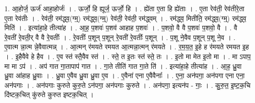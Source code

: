 \documentclass[17pt]{extarticle}
\begin{document}
1. आ॒होर्ज॒ ऊर्ज॑ आहा॒होर्जः॑ । . ऊर्जो॒ हि ह्यूर्ज॒ ऊर्जो॒ हि । . ह्ये॑ता ए॒ता हि ह्ये॑ताः । . ए॒ता रेव॑ती॒ रेव॑तीरे॒ता ए॒ता रेव॑तीः । . रेव॑ती॒ रम॑द्ध्व॒(ग्म्॒) रम॑द्ध्व॒(ग्म्॒) रेव॑ती॒ रेव॑ती॒ रम॑द्ध्वम् । . रम॑द्ध्व॒ मितीति॒ रम॑द्ध्व॒(ग्म्॒) रम॑द्ध्व॒ मिति॑ । . इत्या॑हा॒हे तीत्या॑ह । . आ॒ह॒ प॒शवः॑ प॒शव॑ आहाह प॒शवः॑ । . प॒शवो॒ वै वै प॒शवः॑ प॒शवो॒ वै । . वै रे॒वती॑ रे॒वती॒र् वै वै रे॒वतीः᳚ । . रे॒वतीः᳚ प॒शून् प॒शून् रे॒वती॑ रे॒वतीः᳚ प॒शून् । . प॒शू ने॒वैव प॒शून् प॒शू ने॒व । . ए॒वात्म न्ना॒त्म न्ने॒वैवात्मन्न् । . आ॒त्मन् र॑मयते रमयत आ॒त्मन्ना॒त्मन् र॑मयते । . र॒म॒य॒त॒ इ॒हे ह र॑मयते रमयत इ॒ह । . इ॒हैवैवे हे हैव । . ए॒व स्त॑ स्तै॒वैव स्त॑ । . स्ते॒ त इ॒तः स्त॑ स्ते॒ तः । . इ॒तो मा मेत इ॒तो मा । . मा ऽपाप॒ मा मा ऽप॑ । . अप॑ गात गा॒तापाप॑ गात । . गा॒ते तीति॑ गात गा॒ते ति॑ । . इत्या॑हा॒हे तीत्या॑ह । . आ॒ह॒ ध्रु॒वा ध्रु॒वा आ॑हाह ध्रु॒वाः । . ध्रु॒वा ए॒वैव ध्रु॒वा ध्रु॒वा ए॒व । . ए॒वैना॑ एना ए॒वैवैनाः᳚ । . ए॒ना॒ अन॑पगा॒ अन॑पगा एना एना॒ अन॑पगाः । . अन॑पगाः कुरुते कुरु॒ते ऽन॑पगा॒ अन॑पगाः कुरुते । . अन॑पगा॒ इत्यन॑प - गाः॒ । . कु॒रु॒त॒ इ॒ष्ट॒क॒चि दि॑ष्टक॒चित् कु॑रुते कुरुत इष्टक॒चित् । \newline
\end{document}
